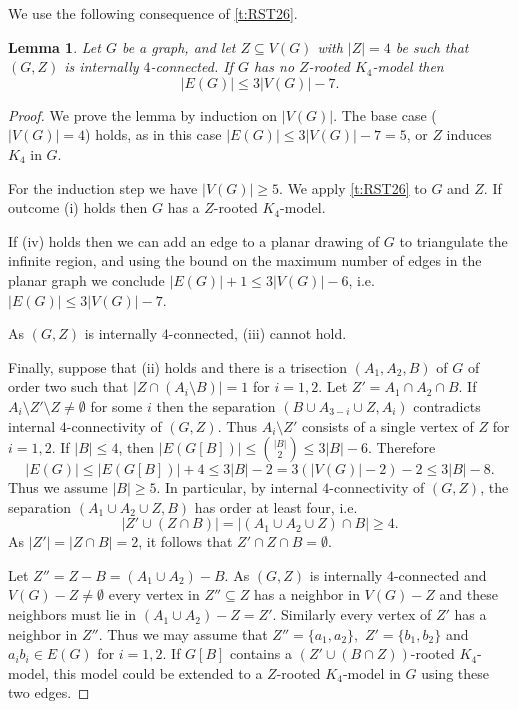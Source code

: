 \documentclass[reqno,final,12pt]{amsart}
\newtheorem{lem}[thm]{Lemma}
\begin{document}
{We use the following consequence of \cref{t:RST26}. 
 	 
 \begin{lem}\label{l:K4}
		Let $G$ be a graph, and let $Z \subseteq V(G)$ with $|Z|=4$ be such that $(G,Z)$ is internally $4$-connected. If $G$ has no $Z$-rooted $K_4$-model then $$|E(G)| \leq 3|V(G)|-7.$$ 
	\end{lem}
	
\begin{proof} We prove the lemma by induction on $|V(G)|$. The base case ($|V(G)| = 4$) holds, as in this case $|E(G)| \leq 3|V(G)|-7 =5$, or $Z$ induces $K_4$ in $G$.
	
	 For the induction step we have $|V(G)| \geq 5$. We apply \cref{t:RST26} to $G$ and $Z$. If outcome (i) holds then $G$ has a $Z$-rooted $K_4$-model. 
	 
	 If (iv) holds then we can add an edge to a planar drawing of $G$ to triangulate the infinite region, and using the bound on the maximum number of edges in the planar graph we conclude  $|E(G)| + 1 \leq 3|V(G)|-6$, i.e.   $|E(G)| \leq 3|V(G)|-7$. 
	 
	 As $(G,Z)$ is internally $4$-connected, (iii) cannot hold.
	
 	Finally, suppose that (ii) holds and  there is a trisection $(A_1,A_2,B)$ of $G$ of order two such that $|Z \cap (A_i \setminus B)| = 1$ for $i = 1, 2$. Let $Z'= A_1 \cap A_2 \cap B$.
	If $A_i \setminus Z' \setminus Z \neq \emptyset$ for some $i$ then the separation $(B \cup A_{3-i} \cup Z, A_i)$  contradicts internal $4$-connectivity of $(G,Z)$. Thus $A_i \setminus Z'$ consists of a single vertex of $Z$ for $i =1,2$. If $|B| \leq 4$, then $|E(G[B])| \leq \binom{|B|}{2} \leq 3|B|-6$. Therefore \begin{equation}\label{e:GB}|E(G)| \leq |E(G[B])| + 4 \leq 3|B|-2 = 3(|V(G)|-2)-2 \leq 3|B|-8.\end{equation}
	Thus we assume $|B| \geq 5$. In particular, by internal $4$-connectivity of $(G,Z)$, the separation $(A_1 \cup A_2 \cup Z, B )$ has order at least four, i.e. $$ |Z' \cup (Z \cap B)| = |(A_1 \cup A_2 \cup Z) \cap B| \geq 4.$$
	As $|Z'|=|Z \cap B| = 2$, it follows that $Z' \cap Z \cap B = \emptyset$. 
	
Let $Z''= Z-B = (A_1 \cup A_2) - B$. As $(G,Z)$ is internally $4$-connected and $V(G)-Z \neq \emptyset$ every vertex in $Z'' \subseteq Z$ has a neighbor in $V(G)-Z$ and  these neighbors must lie in $(A_1 \cup A_2) - Z = Z'$. Similarly every vertex of $Z'$ has a neighbor in $Z''$.  Thus we may assume that $Z''=\{a_1,a_2\},$ $Z'=\{b_1,b_2\}$ and $a_ib_i \in E(G)$ for $i=1,2$. If $G[B]$ contains a 
$(Z' \cup (B \cap Z))$-rooted $K_4$-model, this model could be extended to a $Z$-rooted $K_4$-model in $G$ using these two edges.


\end{proof}}
\end{document}
